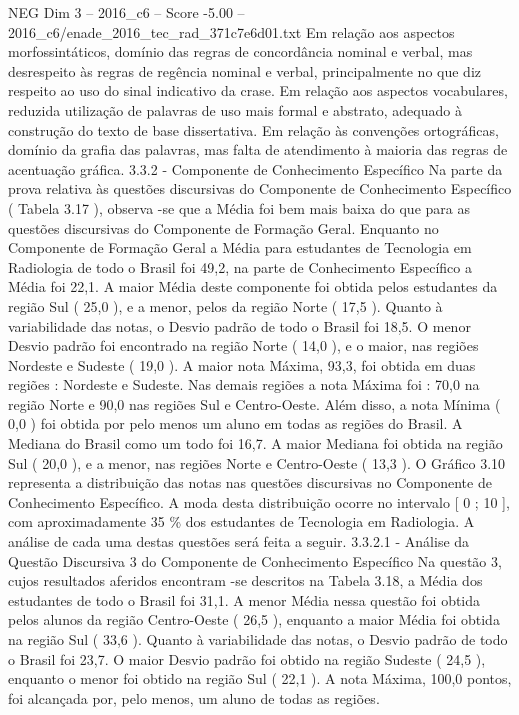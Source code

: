\begin{textsample}{NEG Dim 3 – 2016\_c6 – Score -5.00 – 2016\_c6/enade\_2016\_tec\_rad\_371c7e6d01.txt}
Em relação aos aspectos morfossintáticos, domínio das regras de concordância nominal e verbal, mas desrespeito às regras de regência nominal e verbal, principalmente no que diz respeito ao uso do sinal indicativo da crase.
Em relação aos aspectos vocabulares, reduzida utilização de palavras de uso mais formal e abstrato, adequado à construção do texto de base dissertativa.
Em relação às convenções ortográficas, domínio da grafia das palavras, mas falta de atendimento à maioria das regras de acentuação gráfica. 3.3.2 - Componente de Conhecimento Específico Na parte da prova relativa às questões discursivas do Componente de Conhecimento Específico ( Tabela 3.17 ), observa -se que a Média foi bem mais baixa do que para as questões discursivas do Componente de Formação Geral.
Enquanto no Componente de Formação Geral a Média para estudantes de Tecnologia em Radiologia de todo o Brasil foi 49,2, na parte de Conhecimento Específico a Média foi 22,1.
A maior Média deste componente foi obtida pelos estudantes da região Sul ( 25,0 ), e a menor, pelos da região Norte ( 17,5 ).
Quanto à variabilidade das notas, o Desvio padrão de todo o Brasil foi 18,5.
O menor Desvio padrão foi encontrado na região Norte ( 14,0 ), e o maior, nas regiões Nordeste e Sudeste ( 19,0 ).
A maior nota Máxima, 93,3, foi obtida em duas regiões : Nordeste e Sudeste.
Nas demais regiões a nota Máxima foi : 70,0 na região Norte e 90,0 nas regiões Sul e Centro-Oeste.
Além disso, a nota Mínima ( 0,0 ) foi obtida por pelo menos um aluno em todas as regiões do Brasil.
A Mediana do Brasil como um todo foi 16,7.
A maior Mediana foi obtida na região Sul ( 20,0 ), e a menor, nas regiões Norte e Centro-Oeste ( 13,3 ).
O Gráfico 3.10 representa a distribuição das notas nas questões discursivas no Componente de Conhecimento Específico.
A moda desta distribuição ocorre no intervalo [ 0 ; 10 ], com aproximadamente 35 \% dos estudantes de Tecnologia em Radiologia.
A análise de cada uma destas questões será feita a seguir. 3.3.2.1 - Análise da Questão Discursiva 3 do Componente de Conhecimento Específico Na questão 3, cujos resultados aferidos encontram -se descritos na Tabela 3.18, a Média dos estudantes de todo o Brasil foi 31,1.
A menor Média nessa questão foi obtida pelos alunos da região Centro-Oeste ( 26,5 ), enquanto a maior Média foi obtida na região Sul ( 33,6 ).
Quanto à variabilidade das notas, o Desvio padrão de todo o Brasil foi 23,7.
O maior Desvio padrão foi obtido na região Sudeste ( 24,5 ), enquanto o menor foi obtido na região Sul ( 22,1 ).
A nota Máxima, 100,0 pontos, foi alcançada por, pelo menos, um aluno de todas as regiões.

\end{textsample}
